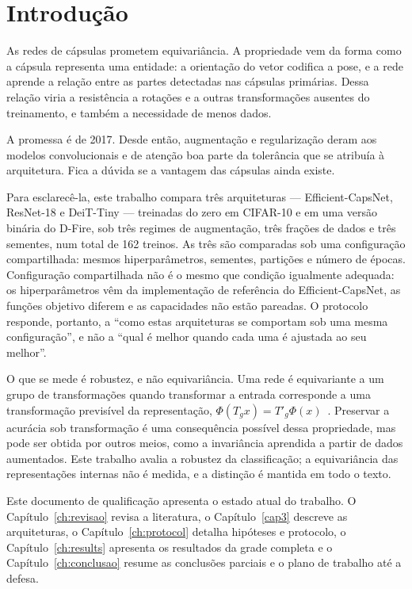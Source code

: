 \chapter{Introdução}
\label{ch:introducao}

As redes de cápsulas prometem equivariância. A propriedade vem da forma como a
cápsula representa uma entidade: a orientação do vetor codifica a pose, e a
rede aprende a relação entre as partes detectadas nas cápsulas primárias. Dessa
relação viria a resistência a rotações e a outras transformações ausentes do
treinamento, e também a necessidade de menos dados.

A promessa é de 2017. Desde então, augmentação e regularização deram aos
modelos convolucionais e de atenção boa parte da tolerância que se atribuía à
arquitetura. Fica a dúvida se a vantagem das cápsulas ainda existe.

Para esclarecê-la, este trabalho compara três arquiteturas --- Efficient-CapsNet,
ResNet-18 e DeiT-Tiny --- treinadas do zero em CIFAR-10 e em uma versão binária
do D-Fire, sob três regimes de augmentação, três frações de dados e três
sementes, num total de 162 treinos. As três são comparadas sob uma configuração
compartilhada: mesmos hiperparâmetros, sementes, partições e número de épocas.
Configuração compartilhada não é o mesmo que condição igualmente adequada: os
hiperparâmetros vêm da implementação de referência do Efficient-CapsNet, as
funções objetivo diferem e as capacidades não estão pareadas. O protocolo
responde, portanto, a ``como estas arquiteturas se comportam sob uma mesma
configuração'', e não a ``qual é melhor quando cada uma é ajustada ao seu
melhor''.

O que se mede é robustez, e não equivariância. Uma rede é equivariante a um
grupo de transformações quando transformar a entrada corresponde a uma
transformação previsível da representação, $\Phi(T_g x) = T'_g \Phi(x)$~\cite{cohen2016group}.
Preservar a acurácia sob transformação é uma consequência possível dessa
propriedade, mas pode ser obtida por outros meios, como a invariância aprendida
a partir de dados aumentados. Este trabalho avalia a robustez da classificação;
a equivariância das representações internas não é medida, e a distinção é
mantida em todo o texto.

Este documento de qualificação apresenta o estado atual do trabalho. O
Capítulo~\ref{ch:revisao} revisa a literatura, o Capítulo~\ref{cap3} descreve
as arquiteturas, o Capítulo~\ref{ch:protocol} detalha hipóteses e protocolo, o
Capítulo~\ref{ch:results} apresenta os resultados da grade completa e o
Capítulo~\ref{ch:conclusao} resume as conclusões parciais e o plano de trabalho
até a defesa.